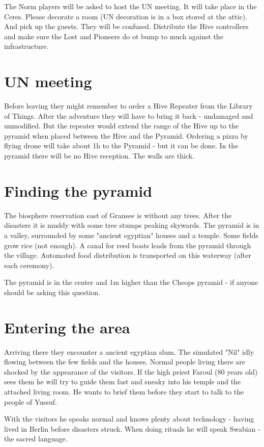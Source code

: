 The Norm players will be asked to host the UN meeting. It will take place in the Ceres. Please decorate a room (UN decoration is in a box stored at the attic). And pick up the guests. They will be confused. Distribute the Hive controllers and make sure the Lost and Pioneers do ot bump to much against the infrastructure.


\section{UN meeting}

Before leaving they might remember to order a Hive Repeater from the Library of Things. After the adventure they will have to bring it back - undamaged and unmodified. But the repeater would extend the range of the Hive up to the pyramid when placed between the Hive and the Pyramid. Ordering a pizza by flying drone will take about 1h to the Pyramid - but it can be done. In the pyramid there will be no Hive reception. The walls are thick.

\section{Finding the pyramid}

The biosphere reservation east of Gransee is without any trees. After the disasters it is muddy with some tree stumps peaking skywards. The pyramid is in a valley, surrounded by some "ancient egyptian" houses and a temple. Some fields grow rice (not enough). A canal for reed boats leads from the pyramid through the village. Automated food distribution is transported on this waterway (after each ceremony).

The pyramid is in the center and 1m higher than the Cheops pyramid - if anyone should be asking this question.

\section{Entering the area}

Arriving there they encounter a ancient egyptian slum. The simulated "Nil" idly flowing between the few fields and the houses. Normal people living there are shocked by the appearance of the visitors. If the high priest Faroul (80 years old) sees them he will try to guide them fast and sneaky into his temple and the attached living room. He wants to brief them before they start to talk to the people of Yussuf.

With the visitors he speaks normal and knows plenty about technology - having lived in Berlin before disasters struck. When doing rituals he will speak Swabian - the sacred language.

